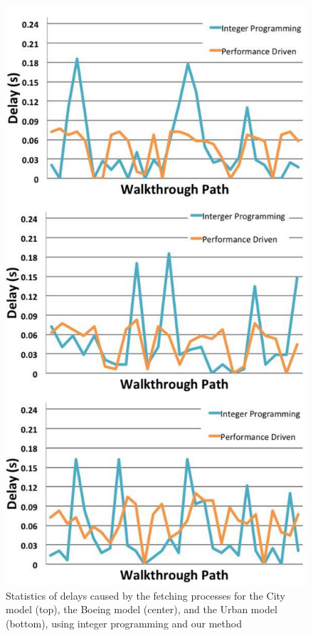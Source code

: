 \begin{figure}[h!]
\centering
\includegraphics[width=\columnwidth]
{comparison_to_lin_programming_all.pdf}
  \caption{Statistics of delays caused by the fetching processes for the City model (top), the Boeing model (center), and
the Urban model (bottom), using integer programming and our method}
  \label{fig:linProgramComparison}
\end{figure}

